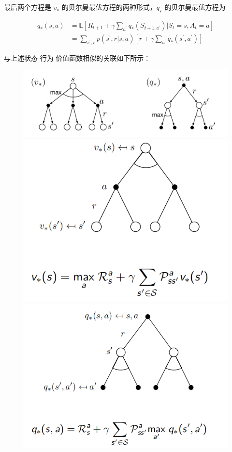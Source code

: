 \documentclass[UTF8,a4paper,12pt]{ctexbook}
\begin{document}
				最后两个方程是 $v_∗$ 的贝尔曼最优方程的两种形式，$q_∗$ 的贝尔曼最优方程为	
				
				$$
				\begin{aligned}
				q_*(s,a) &= \mathbb{E}\left[R_{t+1}+\gamma\sum_{a^\prime}q_*(S_{t+1,a^\prime})|S_t=s,A_t=a\right] \\
				&=\sum_{s^\prime,r}p(s^\prime,r|s,a)[r+\gamma \sum_{a^\prime}q_*(s^\prime,a^\prime)]
				\end{aligned}$$	
				
				与上述状态-行为 价值函数相似的关联如下所示：
				
				\begin{figure}[H]
					\centering
					\includegraphics[width=\linewidth]{qVStar}
					\includegraphics[width=.7\linewidth]{qVStar01}
					\includegraphics[width=.7\linewidth]{qVStar02}
				\end{figure}
				
\end{document}
